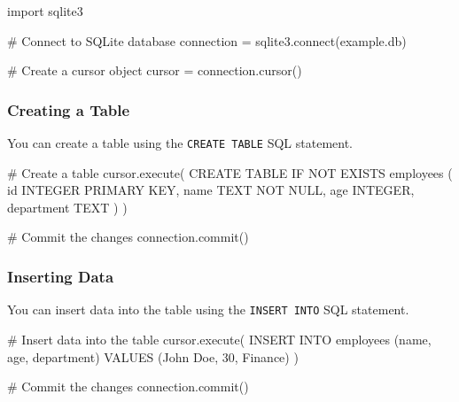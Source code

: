 \documentclass[
  letterpaper,
  DIV=11,
  numbers=noendperiod]{scrreprt}
\newenvironment{Shaded}{\begin{snugshade}}{\end{snugshade}}
\newcommand{\CommentTok}[1]{\textcolor[rgb]{0.37,0.37,0.37}{#1}}
\newcommand{\ExtensionTok}[1]{\textcolor[rgb]{0.00,0.23,0.31}{#1}}
\newcommand{\ImportTok}[1]{\textcolor[rgb]{0.00,0.46,0.62}{#1}}
\newcommand{\NormalTok}[1]{\textcolor[rgb]{0.00,0.23,0.31}{#1}}
\newcommand{\OperatorTok}[1]{\textcolor[rgb]{0.37,0.37,0.37}{#1}}
\newcommand{\StringTok}[1]{\textcolor[rgb]{0.13,0.47,0.30}{#1}}
\begin{document}
\begin{Shaded}
\begin{Highlighting}[]
\ImportTok{import}\NormalTok{ sqlite3}

\CommentTok{\# Connect to SQLite database}
\NormalTok{connection }\OperatorTok{=}\NormalTok{ sqlite3.}\ExtensionTok{connect}\NormalTok{(}\StringTok{\textquotesingle{}example.db\textquotesingle{}}\NormalTok{)}

\CommentTok{\# Create a cursor object}
\NormalTok{cursor }\OperatorTok{=}\NormalTok{ connection.cursor()}
\end{Highlighting}
\end{Shaded}

\subsubsection{Creating a Table}\label{creating-a-table}

You can create a table using the \texttt{CREATE\ TABLE} SQL statement.

\begin{Shaded}
\begin{Highlighting}[]
\CommentTok{\# Create a table}
\NormalTok{cursor.execute(}\StringTok{\textquotesingle{}\textquotesingle{}\textquotesingle{}}
\StringTok{CREATE TABLE IF NOT EXISTS employees (}
\StringTok{    id INTEGER PRIMARY KEY,}
\StringTok{    name TEXT NOT NULL,}
\StringTok{    age INTEGER,}
\StringTok{    department TEXT}
\StringTok{)}
\StringTok{\textquotesingle{}\textquotesingle{}\textquotesingle{}}\NormalTok{)}

\CommentTok{\# Commit the changes}
\NormalTok{connection.commit()}
\end{Highlighting}
\end{Shaded}

\subsubsection{Inserting Data}\label{inserting-data}

You can insert data into the table using the \texttt{INSERT\ INTO} SQL
statement.

\begin{Shaded}
\begin{Highlighting}[]
\CommentTok{\# Insert data into the table}
\NormalTok{cursor.execute(}\StringTok{\textquotesingle{}\textquotesingle{}\textquotesingle{}}
\StringTok{INSERT INTO employees (name, age, department)}
\StringTok{VALUES (\textquotesingle{}John Doe\textquotesingle{}, 30, \textquotesingle{}Finance\textquotesingle{})}
\StringTok{\textquotesingle{}\textquotesingle{}\textquotesingle{}}\NormalTok{)}

\CommentTok{\# Commit the changes}
\NormalTok{connection.commit()}
\end{Highlighting}
\end{Shaded}
\end{document}
